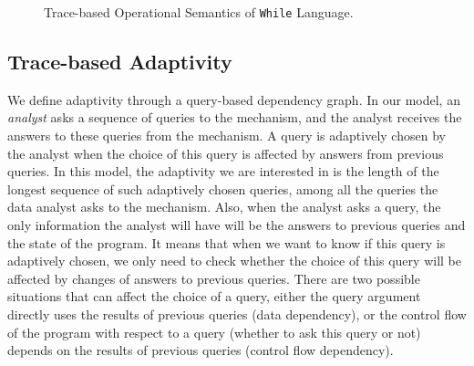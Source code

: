 \documentclass[a4paper,11pt]{article}
\begin{document}
\begin{figure}
{
}
	    \caption{Trace-based Operational Semantics of {\tt While} Language.}
    	\label{fig:evaluation}
	\end{figure}
%
%
%
%

\subsection{ Trace-based Adaptivity}
%
We define adaptivity through a query-based dependency graph. In our model, an \emph{analyst} asks a sequence of queries to the mechanism, and the analyst receives the answers to these queries from the mechanism. A query is adaptively chosen by the analyst when the choice of this query is affected by answers from previous queries. In this model, the adaptivity we are interested in is the length of the longest sequence of such adaptively chosen queries, among all the queries the data analyst asks to the mechanism.  Also, when the analyst asks a query, the only information the analyst will have will be the answers to previous queries and the state of the program. It means that when we want to know if this query is adaptively chosen, we only need to check whether the choice of this query will be affected by changes of answers to previous queries. There are two possible situations that can  affect the choice of a query,  
either the query argument directly uses the results of previous queries (data dependency), or the control flow of the program with respect to a query (whether to ask this query or not) depends on the results of previous queries (control flow dependency).
\end{document}
